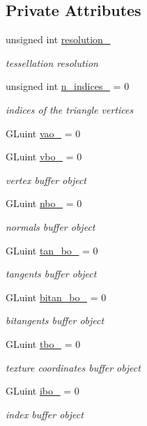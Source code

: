 \subsection*{Private Attributes}
\begin{DoxyCompactItemize}
\item 
unsigned int \hyperlink{classSphere_a6d3defa9cb5c35aa6dfb16e60be375b2}{resolution\+\_\+}
\begin{DoxyCompactList}\small\item\em tessellation resolution \end{DoxyCompactList}\item 
unsigned int \hyperlink{classSphere_a02c9c6431fbc42d50ed697fa01f454ca}{n\+\_\+indices\+\_\+} = 0
\begin{DoxyCompactList}\small\item\em indices of the triangle vertices \end{DoxyCompactList}\item 
G\+Luint \hyperlink{classSphere_a4e5466159b070fdb71874ef3545fa7d7}{vao\+\_\+} = 0
\item 
G\+Luint \hyperlink{classSphere_a6200722a6dc9a6205c05928815baeeb2}{vbo\+\_\+} = 0
\begin{DoxyCompactList}\small\item\em vertex buffer object \end{DoxyCompactList}\item 
G\+Luint \hyperlink{classSphere_a9b6246e4e88fcf9f17d4e0e6a7cbd74d}{nbo\+\_\+} = 0
\begin{DoxyCompactList}\small\item\em normals buffer object \end{DoxyCompactList}\item 
G\+Luint \hyperlink{classSphere_a558372e8833a6cccc087c05bd53b318d}{tan\+\_\+bo\+\_\+} = 0
\begin{DoxyCompactList}\small\item\em tangents buffer object \end{DoxyCompactList}\item 
G\+Luint \hyperlink{classSphere_a37053650f0bf09a5220a813c0deb102a}{bitan\+\_\+bo\+\_\+} = 0
\begin{DoxyCompactList}\small\item\em bitangents buffer object \end{DoxyCompactList}\item 
G\+Luint \hyperlink{classSphere_aa118703b30e8488d50354ff41a0b9ad7}{tbo\+\_\+} = 0
\begin{DoxyCompactList}\small\item\em texture coordinates buffer object \end{DoxyCompactList}\item 
G\+Luint \hyperlink{classSphere_a32575aacfd7539df95f889ecca071d5b}{ibo\+\_\+} = 0
\begin{DoxyCompactList}\small\item\em index buffer object \end{DoxyCompactList}\end{DoxyCompactItemize}



